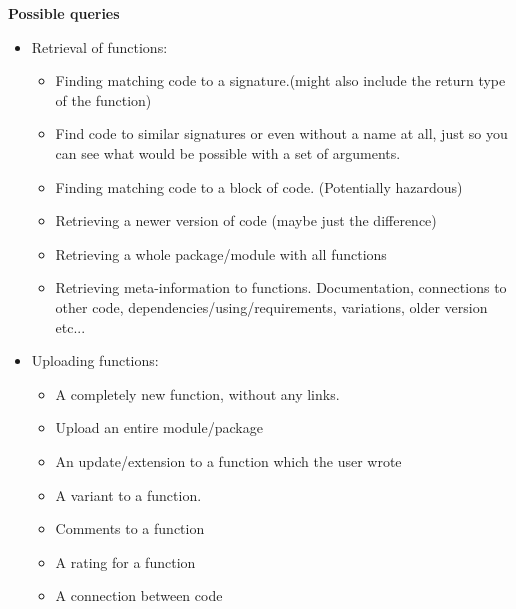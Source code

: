 \documentclass[twoside, 11pt]{scrartcl}
\begin{document}
\textbf{Possible queries}
\begin{itemize}
	\item Retrieval of functions:
	\begin{itemize}
		\item Finding matching code to  a signature.(might also include the return type of the function)
		\item Find code to similar signatures or even without a name at all, just so you can see what would be possible with a set of arguments.
		\item Finding matching code to a block of code. (Potentially hazardous)
		\item Retrieving a newer version of code (maybe just the difference)
		\item Retrieving a whole package/module with all functions
		\item Retrieving meta-information to functions. Documentation, connections to other code, dependencies/using/requirements, variations, older version etc... 
		\end{itemize}
	\item Uploading functions:
	\begin{itemize}
		\item A completely new function, without any links. 
		\item Upload an entire module/package
		\item An update/extension to a function which the user wrote
		\item A variant to a function.
		\item Comments to a function
		\item A rating for a function
		\item A connection between code 
	\end{itemize}		
\end{itemize}

	 
\end{document}
